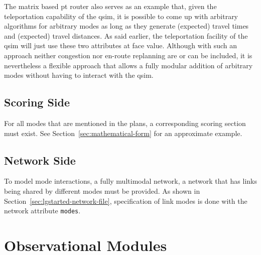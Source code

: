The matrix based pt router also serves as an example that, given the teleportation capability of the \gls{qsim}, it is possible to come up with arbitrary algorithms for arbitrary modes as long as they generate (expected) travel times and (expected) travel distances.  As said earlier, the \gls{teleportation} facility of the \gls{qsim} will just use these two attributes at face value.  Although with such an approach neither congestion nor en-route replanning are or can be included, it is nevertheless a flexible approach that allows a fully modular addition of arbitrary modes without having to interact with the \gls{qsim}.

\subsection{Scoring Side}
For all modes that are mentioned in the plans, a corresponding scoring section must exist.  See Section~\ref{sec:mathematical-form} for an approximate example.

\subsection{Network Side}
To model mode interactions, a fully \gls{multimodal} network, \ie a network that has links being shared by different modes must be provided. 
As shown in Section~\ref{sec:lgstarted-network-file}, specification of link modes is done with the network attribute \lstinline|modes|.

\section{Observational Modules}
\label{sec:observational}

